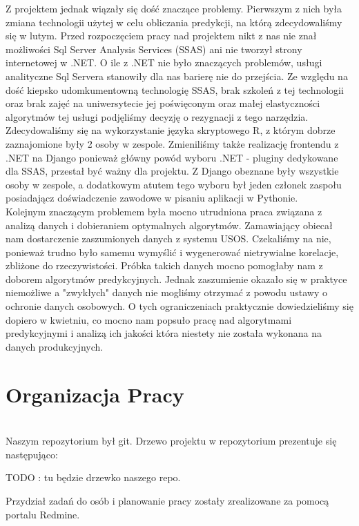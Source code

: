 \documentclass[licencjacka]{pracamgr}
\begin{document}
Z projektem jednak wiązały się dość znaczące problemy. Pierwszym z nich była zmiana technologii użytej w celu obliczania predykcji, na którą zdecydowaliśmy się w lutym. Przed rozpoczęciem pracy nad projektem nikt z nas nie znał możliwości Sql Server Analysis Services (SSAS) ani nie tworzył strony internetowej w .NET. O ile z .NET nie było znaczących problemów, usługi analityczne Sql Servera stanowiły dla nas barierę nie do przejścia. Ze względu na dość kiepsko udomkumentowną technologię SSAS, brak szkoleń z tej technologii oraz brak zajęć na uniwersytecie jej poświęconym oraz małej elastyczności algorytmów tej usługi podjęliśmy decyzję o rezygnacji z tego narzędzia. Zdecydowaliśmy się na wykorzystanie języka skryptowego R, z którym dobrze zaznajomione były 2 osoby w zespole. Zmieniliśmy także realizację frontendu z .NET na Django ponieważ główny powód wyboru .NET - pluginy dedykowane dla SSAS, przestał być ważny dla projektu. Z Django obeznane były wszystkie osoby w zespole, a dodatkowym atutem tego wyboru był jeden członek zaspołu posiadającz doświadczenie zawodowe w pisaniu aplikacji w Pythonie. \\

Kolejnym znaczącym problemem była mocno utrudniona praca związana z analizą danych i dobieraniem optymalnych algorytmów. Zamawiający obiecał nam dostarczenie zaszumionych danych z systemu USOS. Czekaliśmy na nie, ponieważ trudno było samemu wymyślić i wygenerować nietrywialne korelacje, zbliżone do rzeczywistości. Próbka takich danych mocno pomogłaby nam z doborem algorytmów predykcyjnych. Jednak zaszumienie okazało się w praktyce niemożliwe a "zwykłych" danych nie mogliśmy otrzymać z powodu ustawy o ochronie danych osobowych. O tych ograniczeniach praktycznie dowiedzieliśmy się dopiero w kwietniu, co mocno nam popsuło pracę nad algorytmami predykcyjnymi i analizą ich jakości która niestety nie została wykonana na danych produkcyjnych.

\section{Organizacja Pracy} ~\\


Naszym repozytorium był git. Drzewo projektu w repozytorium prezentuje się następująco:

TODO : tu będzie drzewko naszego repo.

Przydział zadań do osób i planowanie pracy zostały zrealizowane za pomocą portalu Redmine. \\
\end{document}
